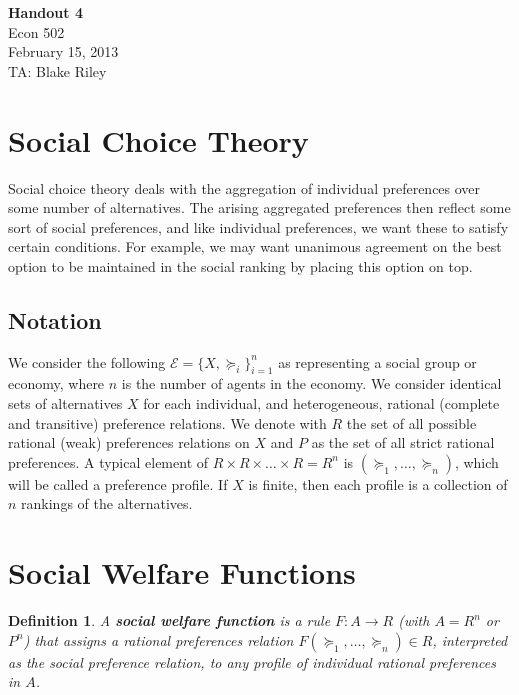 \documentclass[letter, 10pt]{article}
\newtheorem{definition}[theorem]{Definition}
\theoremstyle{definition}
\begin{document}
\begin{spacing}{1.1}

\noindent
\textbf{Handout 4} \\
Econ 502 \\
February 15, 2013 \\
TA: Blake Riley \\

\section{Social Choice Theory}

Social choice theory deals with the aggregation of
individual preferences over some number of
alternatives. The arising aggregated preferences then
reflect some sort of social preferences, and like
individual preferences, we want these to satisfy certain
conditions. For example, we may want unanimous agreement
on the best option to be maintained in the social ranking
by placing this option on top.

\subsection{Notation}

We consider the following $\mathcal{E} = \{X,
\succeq_i\}_{i=1}^n$ as representing a social group or
economy, where $n$ is the number of agents in the
economy. We consider identical sets of alternatives $X$
for each individual, and heterogeneous, rational
(complete and transitive) preference relations. We denote
with $R$ the set of all possible rational (weak)
preferences relations on $X$ and $P$ as the set of all
strict rational preferences. A typical element of $R
\times R \times \ldots \times R = R^n$ is $(\succeq_1,
\ldots, \succeq_n)$, which will be called a preference
profile. If $X$ is finite, then each profile is a
collection of $n$ rankings of the alternatives.

\section{Social Welfare Functions}

\begin{definition}
  A \textbf{social welfare function} is a rule $F: A\to
  R$ (with $A= R^n$ or $P^n$) that assigns a rational
  preferences relation $F(\succeq_1, \ldots, \succeq_n)
  \in R$, interpreted as the social preference relation,
  to any profile of individual rational preferences in $A$.
\end{definition}


\end{spacing}
\end{document}
